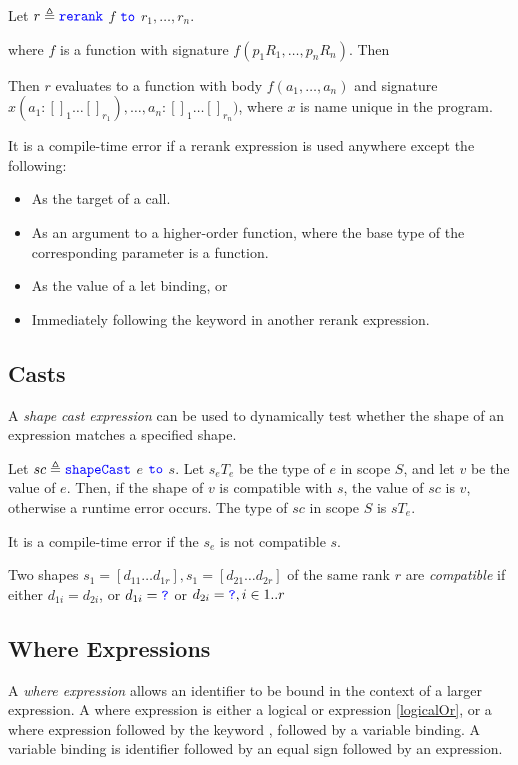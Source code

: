 \documentclass{article}
\begin{document}
{\RerankExpression

Let $r \triangleq  \texttt{\color{blue} rerank}{}$ $f$  $\texttt{\color{blue} to}{}$ $r_1, \ldots, r_n$.

where $f$ is a function with signature $f(p_1 R_1, \ldots, p_n R_n)$. Then

Then $r$ evaluates to a function with body $f(a_1, \ldots, a_n)$ and signature 
$x(a_1: []_1\ldots []_{r_1}), \ldots, a_n: []_1\ldots []_{r_n})$, where $x$ is name unique in the program.

It is a compile-time error if a rerank expression is used anywhere except the following:
\begin{itemize}
\item As the target of a call.
\item  As an argument to a higher-order function, where the base type of the corresponding parameter is a function.
\item As the value of a let binding, or 
\item Immediately following the keyword \RERANK{} in another rerank expression. 
\end{itemize}

\subsection{Casts}
\label{casts}

A {\em shape cast expression} can be used to dynamically test whether the shape of an expression matches a specified shape.

\ShapeCastExpression

Let $sc \triangleq \texttt{\color{blue} shapeCast}{}$ $e$ $\texttt{\color{blue} to}{}$ $s$.
Let $s_e T_e$ be the type of $e$ in scope $S$, and let $v$ be the value of $e$.
Then, if the shape of $v$ is compatible with $s$, the value of $sc$ is $v$, otherwise a runtime error occurs. The type of $sc$ in scope $S$ is $s T_e$. 

It is a compile-time error if the $s_e$ is not compatible $s$.

Two shapes $s_1 = [d_{11} \ldots d_{1r}], s_1 = [d_{21} \ldots d_{2r}]$ of the same rank $r$ are {\em compatible} if either $d_{1i} = d_{2i}$, or $d_{1i} = \texttt{\color{blue} ?}{}$ or  $d_{2i} = \texttt{\color{blue} ?}{}, i \in 1..r$

\subsection{Where Expressions}
\label{whereExpressions}

A {\em where expression} allows an identifier to be bound in the context of a larger expression. A where expression is either a logical or expression \ref{logicalOr}, or a where expression followed by the keyword \WHERE{} , followed by a variable binding. A variable binding is identifier followed by an equal sign followed by an expression.

}
\end{document}
